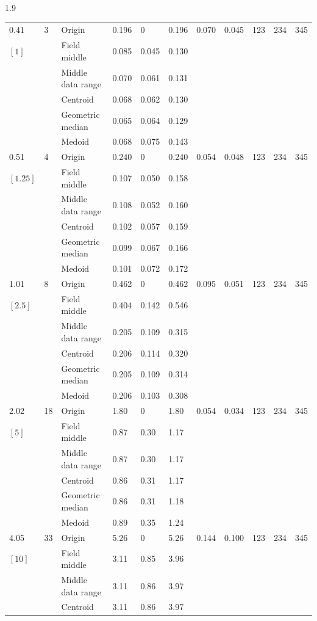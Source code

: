 \documentclass[phd]{ndsu-thesis-2022}
\newcommand\myspacing{1.9} %
\begin{document}
\begin{spacing}{\myspacing}
\begin{landscape}
{{\begin{ThreePartTable}
\begin{longtable}{lll lll ll rrr}
0.41 & 3 & Origin  & 0.196 & 0 & 0.196 & 0.070 & 0.045 & 123 & 234 & 345\\
$[1]$ &  & Field middle  & 0.085 & 0.045 & 0.130 \\
 &  & Middle data range  & 0.070 & 0.061 & 0.131 \\
 &  & Centroid & 0.068 & 0.062 & 0.130 \\
 &  & Geometric median & 0.065 & 0.064 & 0.129 \\
 &  & Medoid  & 0.068 & 0.075 & 0.143 \\
\midrule
0.51 & 4 & Origin  & 0.240 & 0 & 0.240 & 0.054 & 0.048 & 123 & 234 & 345\\
$[1.25]$ &  & Field middle  & 0.107 & 0.050 & 0.158 \\
 &  & Middle data range  & 0.108 & 0.052 & 0.160 \\
 &  & Centroid & 0.102 & 0.057 & 0.159 \\
 &  & Geometric median & 0.099 & 0.067 & 0.166 \\
 &  & Medoid  & 0.101 & 0.072 & 0.172 \\
\midrule
1.01 & 8 & Origin  & 0.462 & 0 & 0.462 & 0.095 & 0.051  & 123 & 234 & 345\\
$[2.5]$ &  & Field middle  & 0.404 & 0.142 & 0.546 \\
 &  & Middle data range  & 0.205 & 0.109 & 0.315 \\
 &  & Centroid & 0.206 & 0.114 & 0.320 \\
 &  & Geometric median & 0.205 & 0.109 & 0.314 \\
 &  & Medoid  & 0.206 & 0.103 & 0.308 \\
\midrule
2.02 & 18 & Origin  & 1.80 & 0 & 1.80 & 0.054 & 0.034 & 123 & 234 & 345 \\
$[5]$ &  & Field middle  & 0.87 & 0.30 & 1.17 \\
 &  & Middle data range  & 0.87 & 0.30 & 1.17 \\
 &  & Centroid & 0.86 & 0.31 & 1.17 \\
 &  & Geometric median & 0.86 & 0.31 & 1.18 \\
 &  & Medoid  & 0.89 & 0.35 & 1.24 \\
\midrule
4.05 & 33 & Origin  & 5.26 & 0 & 5.26 & 0.144 & 0.100 & 123 & 234 & 345 \\
$[10]$ &  & Field middle  & 3.11 & 0.85 & 3.96 \\
 &  & Middle data range  & 3.11 & 0.86 & 3.97 \\
 &  & Centroid & 3.11 & 0.86 & 3.97 \\

\end{longtable}
\end{ThreePartTable}}}
\end{landscape}
\end{spacing}
\end{document}
